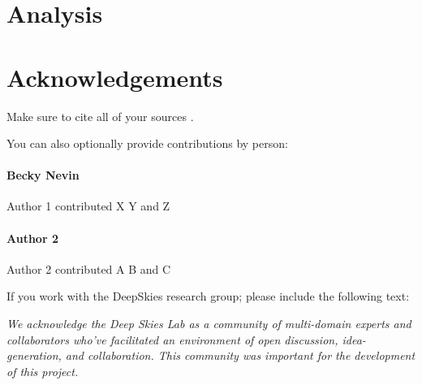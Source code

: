\documentclass[twocolumn]{aastex631}
\newcommand{\editor}[1]{{\color{purple} #1}}
\begin{document}
\section{Analysis}
\subsection{}







\section {Acknowledgements}

Make sure to cite \cite{harris2020array} all of your sources \cite{Hunter:2007}.


You can also optionally provide contributions by person:

\paragraph{Becky Nevin}
Author 1 contributed X Y and Z

\paragraph{Author 2}
Author 2 contributed A B and C

If you work with the DeepSkies research group; please include the following text:

\emph{We acknowledge the Deep Skies Lab as a community of multi-domain experts and collaborators who’ve facilitated an environment of open discussion, idea-generation, and collaboration. This community was important for the development of this project.}


\end{document}
